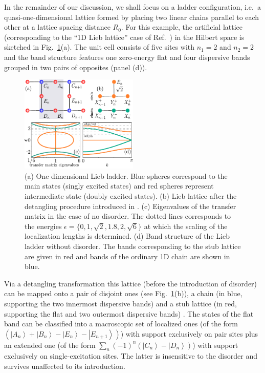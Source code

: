 \documentclass[prl,aps,twocolumn,showpacs,superscriptaddress,longbibliography]{revtex4-1}
\newcommand{\ran}{\right\rangle}
\newcommand{\ket}[1]{\left| #1 \ran}
\begin{document}
In the remainder of our discussion, we shall focus on a ladder configuration, i.e.~a quasi-one-dimensional lattice formed by placing two linear chains parallel to each other at a lattice spacing distance $R_0$. For this example, the artificial lattice (corresponding to the ``1D Lieb lattice'' case of Ref.~\cite{Leykam2017}) in the Hilbert space is sketched in Fig.~\ref{Fig:decoupling}(a). The unit cell consists of five sites with $n_1 = 2$ and $n_2 = 2$ and the band structure features one zero-energy flat and four dispersive bands grouped in two pairs of opposites (panel (d)). 
%
\begin{figure}
% 	    

	      \includegraphics[width=0.5\textwidth]{graphics/decoupling.pdf}

		\caption{(a) One dimensional Lieb ladder. Blue spheres correspond to the main states (singly excited states) and red spheres represent intermediate state
		(doubly excited states). (b) Lieb lattice after the detangling procedure introduced in \cite{a_Flach_EPL_14,Leykam2017}.
		     (c) Eigenvalues of the transfer matrix in the case of no disorder.
		     The dotted lines corresponds to the energies $\epsilon = \{0,1, \sqrt 2, 1.8, 2, \sqrt 6\}$ at which the scaling of the localization lengths is determined.
                    (d) Band structure of the Lieb ladder without disorder. The bands corresponding to the stub lattice are given in red and bands of the ordinary 1D chain are shown in blue.
                    }
  
	\label{Fig:decoupling}
\end{figure}  
%
%
Via a detangling transformation \cite{a_Flach_EPL_14,Leykam2017} this lattice (before the introduction of disorder) can be mapped onto a pair of disjoint ones (see Fig.~\ref{Fig:decoupling}(b)), a chain (in blue, supporting the two innermost dispersive bands) and a stub lattice (in red, supporting the flat and two outermost dispersive bands) \cite{SM}. The states of the flat band can be classified into a macroscopic set of localized ones (of the form $(\ket{A_n} + \ket{B_n} - \ket{E_n} - \ket{E_{n+1}})$) with support exclusively on pair sites plus an extended one (of the form $\sum_n (-1)^n (\ket{C_n} - \ket{D_n})$) with support exclusively on single-excitation sites. The latter is insensitive to the disorder and survives unaffected to its introduction. 
\end{document}

